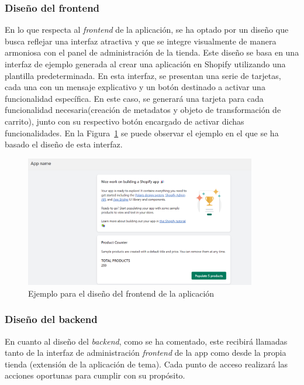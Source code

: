 \documentclass[12pt]{article}
\begin{document}
\subsubsection{Diseño del frontend}

En lo que respecta al \textit{frontend} de la aplicación, se ha optado por un diseño que busca reflejar una interfaz atractiva
y que se integre visualmente de manera armoniosa con el panel de administración de la tienda. 
Este diseño se basa en una interfaz de ejemplo generada al crear una aplicación en Shopify utilizando 
una plantilla predeterminada. En esta interfaz, se presentan una serie de tarjetas, cada una con un mensaje 
explicativo y un botón destinado a activar una funcionalidad específica. En este caso, se generará una tarjeta 
para cada funcionalidad necesaria(creación de metadatos y objeto de transformación de carrito), junto con su respectivo botón encargado de 
activar dichas funcionalidades. En la Figura~\ref{fig:disenoFront} se puede observar el ejemplo en el que se ha basado el diseño de esta interfaz.

\begin{figure}[ht]
    \centering
    \includegraphics[width=0.9\textwidth]{imagenes-diseño/diseñoFrontend.png}
    \caption{\label{fig:disenoFront}Ejemplo para el diseño del frontend de la aplicación}
    \vspace{\fill}
\end{figure}

\subsubsection{Diseño del backend}
En cuanto al diseño del \textit{backend}, como se ha comentado, este recibirá llamadas tanto de la interfaz de administración {\textit{frontend} de la app} como
desde la propia tienda (extensión de la aplicación de tema). Cada punto de acceso realizará las acciones oportunas para cumplir con su propósito.
\end{document}
